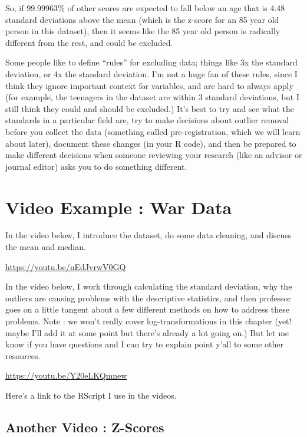 \documentclass[
  letterpaper,
  DIV=11,
  numbers=noendperiod,
  oneside]{scrreprt}
\begin{document}
So, if 99.99963\% of other scores are expected to fall below an age that
is 4.48 standard deviations above the mean (which is the z-score for an
85 year old person in this dataset), then it seems like the 85 year old
person is radically different from the rest, and could be excluded.

Some people like to define ``rules'' for excluding data; things like 3x
the standard deviation, or 4x the standard deviation. I'm not a huge fan
of these rules, since I think they ignore important context for
variables, and are hard to always apply (for example, the teenagers in
the dataset are within 3 standard deviations, but I still think they
could and should be excluded.) It's best to try and see what the
standards in a particular field are, try to make decisions about outlier
removal before you collect the data (something called pre-registration,
which we will learn about later), document these changes (in your R
code), and then be prepared to make different decisions when someone
reviewing your research (like an advisor or journal editor) asks you to
do something different.

\section{Video Example : War Data}\label{video-example-war-data}

In the video below, I introduce the dataset, do some data cleaning, and
discuss the mean and median.

\url{https://youtu.be/nEdJvrwV0GQ}

In the video below, I work through calculating the standard deviation,
why the outliers are causing problems with the descriptive statistics,
and then professor goes on a little tangent about a few different
methods on how to address these problems. Note : we won't really cover
log-transformations in this chapter (yet! maybe I'll add it at some
point but there's already a lot going on.) But let me know if you have
questions and I can try to explain point y'all to some other resources.

\url{https://youtu.be/Y20eLKQmnew}

Here's a link to the RScript I use in the videos.

\subsection{Another Video : Z-Scores}\label{another-video-z-scores}
\end{document}
